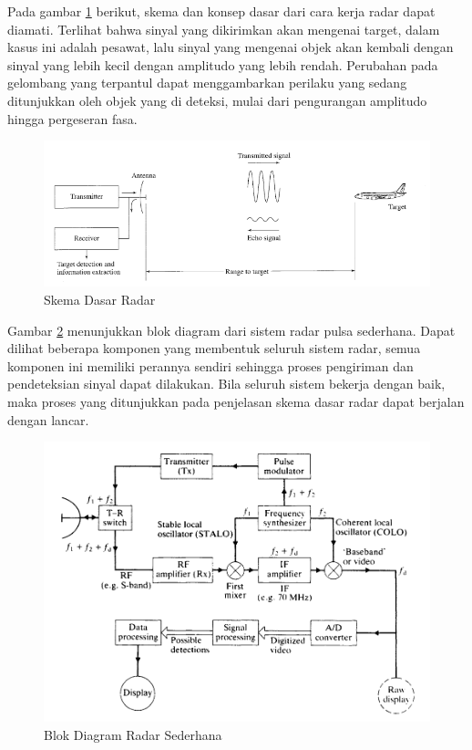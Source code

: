 Pada gambar \ref{pic:skemaRadar} berikut, skema dan konsep dasar dari cara kerja radar dapat diamati. Terlihat bahwa sinyal yang dikirimkan akan mengenai target, dalam kasus ini adalah pesawat, lalu sinyal yang mengenai objek akan kembali dengan sinyal yang lebih kecil dengan amplitudo yang lebih rendah. Perubahan pada gelombang yang terpantul dapat menggambarkan perilaku yang sedang ditunjukkan oleh objek yang di deteksi, mulai dari pengurangan amplitudo hingga pergeseran fasa.

\begin{figure}
	\begin{center}
		\includegraphics[scale=0.5]{pics/bab2/skemaradar.png} 
		\caption[Skema Dasar Radar]{{Skema Dasar Radar} \cite{Skolnik2001}}
		\label{pic:skemaRadar}
	\end{center}
\end{figure}

Gambar \ref{pic:blokdiagram} menunjukkan blok diagram dari sistem radar pulsa sederhana. Dapat dilihat beberapa komponen yang membentuk seluruh sistem radar, semua komponen ini memiliki perannya sendiri sehingga proses pengiriman dan pendeteksian sinyal dapat dilakukan.  Bila seluruh sistem bekerja dengan baik, maka proses yang ditunjukkan pada penjelasan skema dasar radar dapat berjalan dengan lancar.

\begin{figure}
	\begin{center}
		\includegraphics[scale=0.35]{pics/bab2/blokdiagram.png} 
		\caption[Blok Diagram Radar]{{Blok Diagram Radar Sederhana \cite{Kingsley1999}}}
		\label{pic:blokdiagram}
	\end{center}
\end{figure}

